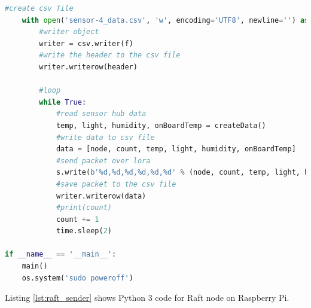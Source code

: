 \documentclass[oneside,12pt]{book}
\begin{document}
\begin{lstlisting}[language={Python},caption={Sender code without consensus algorithm implementation- Python3},captionpos=b,label={lst:noAlg_sender}]
    #create csv file
    with open('sensor-4_data.csv', 'w', encoding='UTF8', newline='') as f:
        #writer object
        writer = csv.writer(f)
        #write the header to the csv file
        writer.writerow(header)

        #loop 
        while True:        
            #read sensor hub data
            temp, light, humidity, onBoardTemp = createData()
            #write data to csv file
            data = [node, count, temp, light, humidity, onBoardTemp]
            #send packet over lora
            s.write(b'%d,%d,%d,%d,%d,%d' % (node, count, temp, light, humidity, onBoardTemp))
            #save packet to the csv file
			writer.writerow(data)			
            #print(count)
            count += 1
            time.sleep(2)

if __name__ == '__main__':
    main()
    os.system('sudo poweroff')
\end{lstlisting}
Listing \ref{lst:raft_sender} shows Python 3 code for Raft node on Raspberry Pi.
\end{document}
